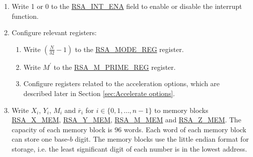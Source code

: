 \documentclass[main\_\_EN.tex]{subfiles}
\begin{document}
\begin{enumerate}

    \item Write 1 or 0 to the \hyperref[fielddesc:RSAINTENA]{RSA\_INT\_ENA} field to enable or disable the interrupt function.
    
    \item Configure relevant registers:   
    
    \begin{enumerate}
        \item Write \begin{math}( \frac{N}{32} - 1 )\end{math} to the \hyperref[regdesc:RSAMODEREG]{RSA\_MODE\_REG} register.
        
        \item Write \begin{math}M^{\prime}\end{math} to the \hyperref[regdesc:RSAMPRIMEREG]{RSA\_M\_PRIME\_REG} register.
        
        \item Configure registers related to the acceleration options, which are described later in Section \ref{sec:Accelerate options}.
        
    \end{enumerate}

    \item Write
        \begin{math}X_{i}\end{math},
        \begin{math}Y_{i}\end{math},
        \begin{math}M_{i}\end{math} and
        \begin{math}\overline{r}_{i}\end{math} for \begin{math}i \in \{ 0, 1, \dots, n-1 \} \end{math}
        to memory blocks \hyperref[regdesc:RSAmemory]{RSA\_X\_MEM}, \hyperref[regdesc:RSAmemory]{RSA\_Y\_MEM}, \hyperref[regdesc:RSAmemory]{RSA\_M\_MEM} and \hyperref[regdesc:RSAmemory]{RSA\_Z\_MEM}. The capacity of each memory block is 96 words. Each word of each memory block can store one base-\begin{math}b\end{math} digit. The memory blocks use the little endian format for storage, i.e. the least significant digit of each number is in the lowest address.
        

\end{enumerate}
\end{document}
